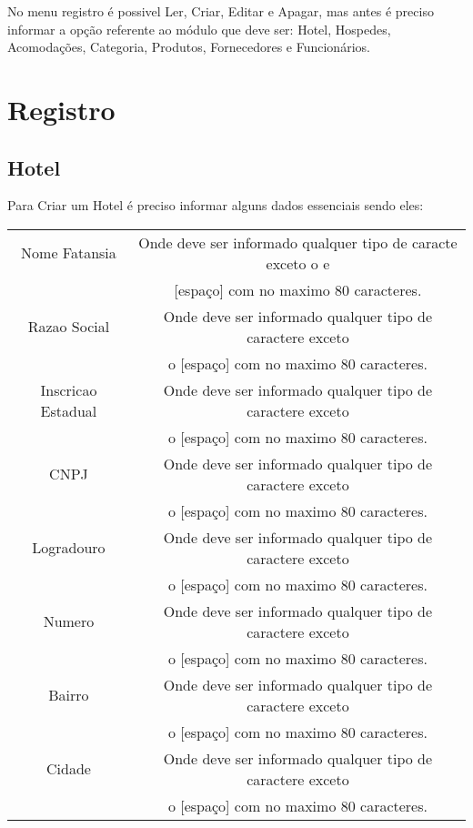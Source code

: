 \documentclass[titlepage]{article}
\begin{document}
				No menu registro é possivel Ler, Criar, Editar e Apagar, mas antes é preciso informar a opção referente ao módulo que deve ser: Hotel, Hospedes, Acomodações, Categoria, Produtos, Fornecedores e Funcionários.\\

				\newpage
				\section{Registro}
				\subsection{Hotel}
				Para Criar um Hotel é preciso informar alguns dados essenciais sendo eles:\\
				\begin{table}[h]%
					\begin{tabular}{|c|c|}
						\hline
						Nome Fatansia & Onde deve ser informado qualquer tipo de caracte exceto o e \\ & [espaço] com no maximo 80 caracteres.\\
						\hline
						Razao Social & Onde deve ser informado qualquer tipo de caractere exceto \\ & o [espaço] com no maximo 80 caracteres.\\
						\hline
						Inscricao Estadual & Onde deve ser informado qualquer tipo de caractere exceto \\ & o [espaço] com no maximo 80 caracteres.\\
						\hline
						CNPJ & Onde deve ser informado qualquer tipo de caractere exceto \\ & o [espaço] com no maximo 80 caracteres.\\
						\hline
						Logradouro & Onde deve ser informado qualquer tipo de caractere exceto \\ & o [espaço] com no maximo 80 caracteres.\\
						\hline
						Numero & Onde deve ser informado qualquer tipo de caractere exceto \\ & o [espaço] com no maximo 80 caracteres.\\
						\hline
						Bairro & Onde deve ser informado qualquer tipo de caractere exceto \\ & o [espaço] com no maximo 80 caracteres.\\
						\hline
						Cidade & Onde deve ser informado qualquer tipo de caractere exceto \\ & o [espaço] com no maximo 80 caracteres.\\

\end{tabular}
\end{table}
\end{document}
